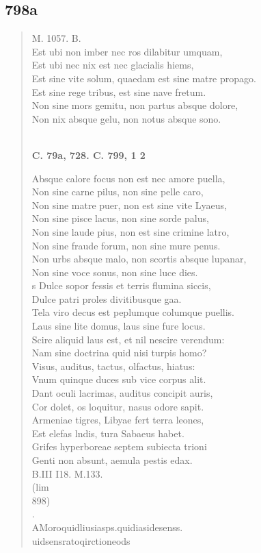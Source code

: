 \documentclass[11pt, a4paper]{report}
\begin{document}
            \subsection*{798a}
      \begin{verse}
      M. 1057. B. \\ Est ubi non imber nec ros dilabitur umquam, \\ Est ubi nec nix est nec glacialis hiems, \\ Est sine vite solum, quaedam  \lbrack est \rbrack  sine matre propago. \\ Est sine rege tribus, est sine nave fretum. \\ Non sine mors gemitu, non partus absque dolore, \\ Non nix absque gelu, non notus absque sono. \\ 
        ﻿\pagebreak 
    \begin{center} \textbf{C. 79a, 728. C. 799, 1 2} \end{center} \marginpar{[275]} Absque calore focus non est nec amore puella, \\ Non sine carne pilus, non sine pelle caro, \\ Non sine matre puer, non est sine vite Lyaeus, \\ Non sine pisce lacus, non sine sorde palus, \\ Non sine laude pius, non est sine crimine latro, \\ Non sine fraude forum, non sine mure penus. \\ Non urbs absque malo, non scortis absque lupanar, \\ Non sine voce sonus, non sine luce dies. \\ s Dulce sopor fessis et terris flumina siccis, \\ Dulce patri proles divitibusque gaa. \\ Tela viro decus est peplumque columque puellis. \\ Laus sine lite domus, laus sine fure locus. \\ Scire aliquid laus est, et nil nescire verendum: \\ Nam sine doctrina quid nisi turpis homo? \\ Visus, auditus, tactus, olfactus, hiatus: \\ Vnum quinque duces sub vice corpus alit. \\ Dant oculi lacrimas, auditus concipit auris, \\ Cor dolet, os loquitur, nasus odore sapit. \\ Armeniae tigres, Libyae fert terra leones, \\ Est elefas lndis, tura Sabaeus habet. \\ Grifes hyperboreae septem subiecta trioni \\ Genti non absunt, aemula pestis edax. \\ B.III I18. M.133. \\ (lim \\ 898) \\ . \\  \lbrack AMoroquidliusiasps.quidiasidesenss. \\ uidsensratoqirctioneods \\ 

\end{verse}
\end{document}
